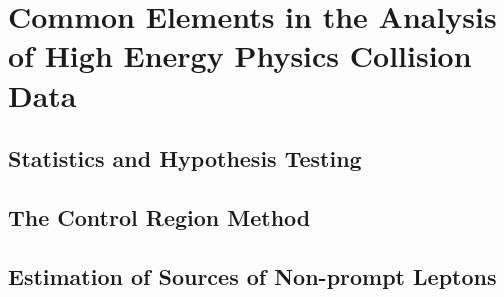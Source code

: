 \chapter{Common Elements in the Analysis of High Energy Physics Collision Data}
\label{chap:common_search}


\section{Statistics and Hypothesis Testing}

\section{The Control Region Method}

\section{Estimation of Sources of Non-prompt Leptons}
